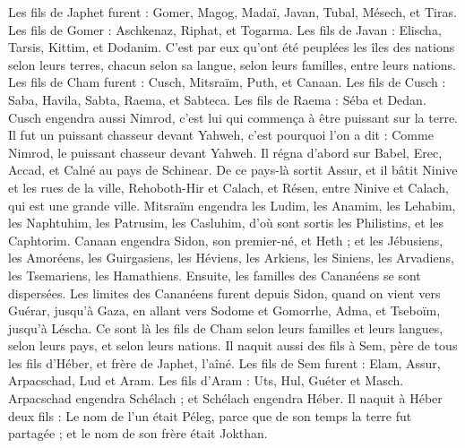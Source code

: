 \begin{multicols}{2}
Les fils de Japhet furent : Gomer, Magog, Madaï, Javan, Tubal, Mésech, et Tiras.
Les fils de Gomer : Aschkenaz, Riphat, et Togarma.
Les fils de Javan : Elischa, Tarsis, Kittim, et Dodanim.
C’est par eux qu’ont été peuplées les îles des nations selon leurs terres, chacun selon sa langue, selon leurs familles, entre leurs nations.
Les fils de Cham furent : Cusch, Mitsraïm, Puth, et Canaan.
Les fils de Cusch : Saba, Havila, Sabta, Raema, et Sabteca. Les fils de Raema : Séba et Dedan.
Cusch engendra aussi Nimrod, c’est lui qui commença à être puissant sur la terre.
Il fut un puissant chasseur devant Yahweh, c'est pourquoi l'on a dit : Comme Nimrod, le puissant chasseur devant Yahweh.
Il régna d’abord sur Babel, Erec, Accad, et Calné au pays de Schinear.
De ce pays-là sortit Assur, et il bâtit Ninive et les rues de la ville, Rehoboth-Hir et Calach,
et Résen, entre Ninive et Calach, qui est une grande ville.
Mitsraïm engendra les Ludim, les Anamim, les Lehabim, les Naphtuhim,
les Patrusim, les Casluhim, d’où sont sortis les Philistins, et les Caphtorim.
Canaan engendra Sidon, son premier-né, et Heth ;
et les Jébusiens, les Amoréens, les Guirgasiens,
les Héviens, les Arkiens, les Siniens,
les Arvadiens, les Tsemariens, les Hamathiens. Ensuite, les familles des Cananéens se sont dispersées.
Les limites des Cananéens furent depuis Sidon, quand on vient vers Guérar, jusqu'à Gaza, en allant vers Sodome et Gomorrhe, Adma, et Tseboïm, jusqu'à Léscha.
Ce sont là les fils de Cham selon leurs familles et leurs langues, selon leurs pays, et selon leurs nations.
Il naquit aussi des fils à Sem, père de tous les fils d'Héber, et frère de Japhet, l’aîné.
Les fils de Sem furent : Elam, Assur, Arpacschad, Lud et Aram.
Les fils d'Aram : Uts, Hul, Guéter et Masch.
Arpacschad engendra Schélach ; et Schélach engendra Héber.
Il naquit à Héber deux fils : Le nom de l'un était Péleg, parce que de son temps la terre fut partagée ; et le nom de son frère était Jokthan.

\end{multicols}
